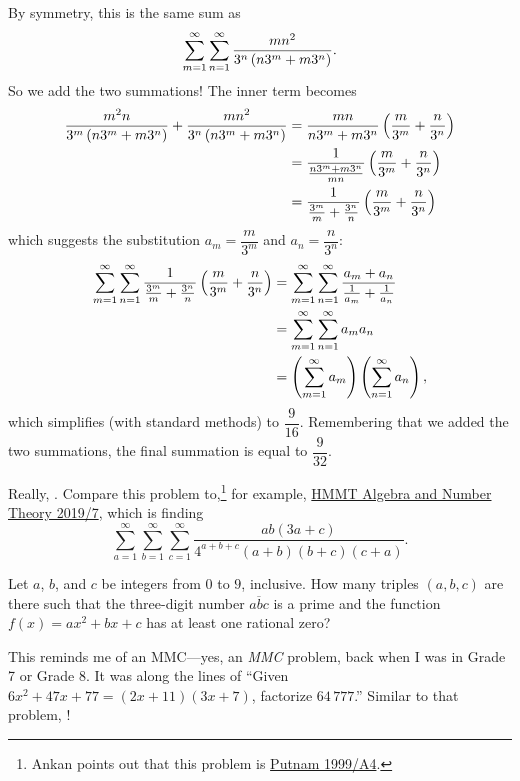 \documentclass[11pt,paper=letter]{scrartcl}
\begin{document}
By symmetry, this is the same sum as $$\sum_{m=1}^{\infty} \sum_{n=1}^{\infty} \frac{mn^2}{3^n \left( n3^m + m3^n \right)}.$$ So we add the two summations! The inner term becomes
\begin{align*}
  \frac{m^2n}{3^m \left( n3^m + m3^n \right)} + \frac{mn^2}{3^n \left( n3^m + m3^n \right)} &= \frac{mn}{n3^m + m3^n}\left( \frac{m}{3^m} + \frac{n}{3^n} \right) \\
  &= \frac{1}{\frac{n3^m + m3^n}{mn}}\left( \frac{m}{3^m} + \frac{n}{3^n} \right) \\
  &= \frac{1}{\frac{3^m}{m} + \frac{3^n}{n}}\left( \frac{m}{3^m} + \frac{n}{3^n} \right)
\end{align*}
which suggests the substitution $a_m = \dfrac{m}{3^m}$ and $a_n = \dfrac{n}{3^n}$:
\begin{align*}
  \sum_{m=1}^{\infty} \sum_{n=1}^{\infty} \frac{1}{\frac{3^m}{m} + \frac{3^n}{n}}\left( \frac{m}{3^m} + \frac{n}{3^n} \right) &= \sum_{m=1}^{\infty} \sum_{n=1}^{\infty} \frac{a_m+a_n}{\frac{1}{a_m} + \frac{1}{a_n}} \\
  &= \sum_{m=1}^{\infty} \sum_{n=1}^{\infty} a_ma_n \\
  &= \left( \sum_{m=1}^{\infty} a_m \right)\left( \sum_{n=1}^{\infty} a_n \right),
\end{align*}
which simplifies (with standard methods) to $\dfrac9{16}$. Remembering that we added the two summations, the final summation is equal to $\dfrac9{32}$.

Really, . Compare this problem to,\footnote{Ankan points out that this problem is \href{https://artofproblemsolving.com/community/c7h513428p2882541}{Putnam 1999/A4}.} for example, \href{https://s3.amazonaws.com/hmmt-archive/february/2019/HMMTFebruary2019AlgebraandNumberTheoryTest.pdf}{HMMT Algebra and Number Theory 2019/7}, which is finding
$$\sum_{a=1}^{\infty}\sum_{b=1}^{\infty}\sum_{c=1}^{\infty} \frac{ab(3a+c)}{4^{a+b+c}(a+b)(b+c)(c+a)}.$$

\begin{probboxed}
   Let $a$, $b$, and $c$ be integers from $0$ to $9$, inclusive. How many triples $(a, b, c)$ are there such that the three-digit number $\overline{abc}$ is a prime and the function $f(x) = ax^2 + bx + c$ has at least one rational zero?
\end{probboxed}

This reminds me of an MMC---yes, an \emph{MMC} problem, back when I was in Grade 7 or Grade 8. It was along the lines of ``Given $6x^2 + 47x + 77 = (2x + 11)(3x + 7)$, factorize $64\,777$.'' Similar to that problem, !
\end{document}
